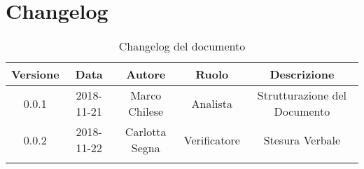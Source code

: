\newpage

\section{Changelog}

\begin{center}
\begin{longtable}{|c|c|c|c|c|}
\hline
\textbf{Versione} & \textbf{Data} & \textbf{Autore} & \textbf{Ruolo} & \textbf{Descrizione} \\
\hline \hline
\endfirsthead
0.0.1 & 2018-11-21 & Marco Chilese & Analista & Strutturazione del Documento \\
0.0.2 & 2018-11-22 & Carlotta Segna & Verificatore & Stesura Verbale \\
\hline
\caption{Changelog del documento}
\end{longtable}
\end{center}
